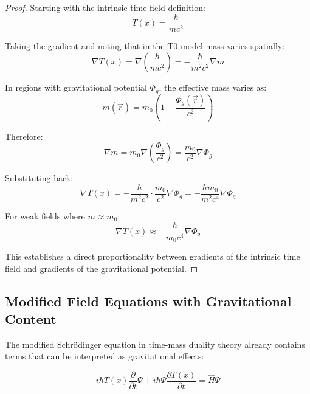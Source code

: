 \documentclass{article}
\theoremstyle{definition}
\theoremstyle{remark}
\newcommand{\Tfield}{T(x)} %
\begin{document}
\begin{proof}
	Starting with the intrinsic time field definition:
	\begin{equation}
		\Tfield = \frac{\hbar}{mc^2}
	\end{equation}
	
	Taking the gradient and noting that in the T0-model mass varies spatially:
	\begin{equation}
		\nabla \Tfield = \nabla \left(\frac{\hbar}{mc^2}\right) = -\frac{\hbar}{m^2c^2}\nabla m
	\end{equation}
	
	In regions with gravitational potential $\Phi_g$, the effective mass varies as:
	\begin{equation}
		m(\vec{r}) = m_0\left(1 + \frac{\Phi_g(\vec{r})}{c^2}\right)
	\end{equation}
	
	Therefore:
	\begin{equation}
		\nabla m = m_0 \nabla\left(\frac{\Phi_g}{c^2}\right) = \frac{m_0}{c^2}\nabla\Phi_g
	\end{equation}
	
	Substituting back:
	\begin{equation}
		\nabla \Tfield = -\frac{\hbar}{m^2c^2}\cdot\frac{m_0}{c^2}\nabla\Phi_g = -\frac{\hbar m_0}{m^2c^4}\nabla\Phi_g
	\end{equation}
	
	For weak fields where $m \approx m_0$:
	\begin{equation}
		\nabla \Tfield \approx -\frac{\hbar}{m_0c^4}\nabla\Phi_g
	\end{equation}
	
	This establishes a direct proportionality between gradients of the intrinsic time field and gradients of the gravitational potential.
\end{proof}

\subsection{Modified Field Equations with Gravitational Content}

The modified Schrödinger equation in time-mass duality theory already contains terms that can be interpreted as gravitational effects:

\begin{equation}
	i\hbar \Tfield\frac{\partial}{\partial t}\Psi + i\hbar\Psi\frac{\partial \Tfield}{\partial t} = \hat{H}\Psi
\end{equation}
\end{document}

